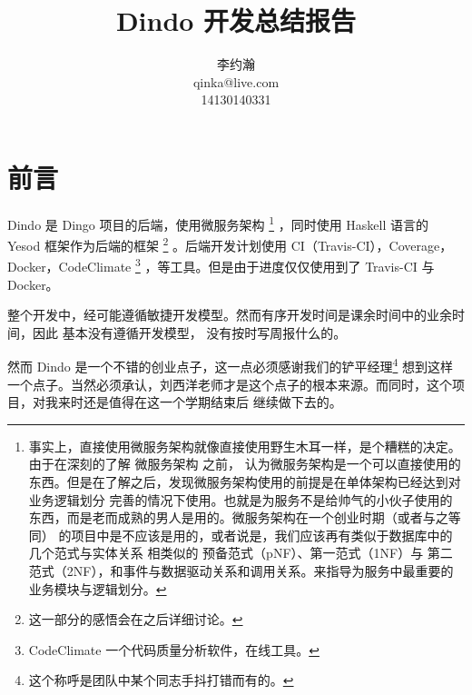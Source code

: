 \documentclass{dingo}
\title{Dindo 开发总结报告}
\author{李约瀚\\qinka@live.com\\14130140331}
\begin{document}
  \makecover
  \section*{前言}
   Dindo 是 Dingo 项目的后端，使用微服务架构
    \footnote{事实上，直接使用微服务架构就像直接使用野生木耳一样，是个糟糕的决定。由于在深刻的了解 微服务架构 之前，
    认为微服务架构是一个可以直接使用的东西。但是在了解之后，发现微服务架构使用的前提是在单体架构已经达到对业务逻辑划分
    完善的情况下使用。也就是为服务不是给帅气的小伙子使用的东西，而是老而成熟的男人是用的。微服务架构在一个创业时期（或者与之等同）
    的项目中是不应该是用的，或者说是，我们应该再有类似于数据库中的 几个范式与实体关系 相类似的 预备范式（pNF）、第一范式（1NF）与
    第二范式（2NF），和事件与数据驱动关系和调用关系。来指导为服务中最重要的业务模块与逻辑划分。}
  ，同时使用 Haskell 语言的 Yesod 框架作为后端的框架
    \footnote{这一部分的感悟会在之后详细讨论。}
  。后端开发计划使用 CI（Travis-CI），Coverage，Docker，CodeClimate
    \footnote{CodeClimate 一个代码质量分析软件，在线工具。}
  ，等工具。但是由于进度仅仅使用到了 Travis-CI 与 Docker。

  整个开发中，经可能遵循敏捷开发模型。然而有序开发时间是课余时间中的业余时间，因此 基本没有遵循开发模型，
  没有按时写周报什么的。

  然而 Dindo 是一个不错的创业点子，这一点必须感谢我们的铲平经理\footnote{这个称呼是团队中某个同志手抖打错而有的。}
  想到这样一个点子。当然必须承认，刘西洋老师才是这个点子的根本来源。而同时，这个项目，对我来时还是值得在这一个学期结束后
  继续做下去的。
\end{document}
